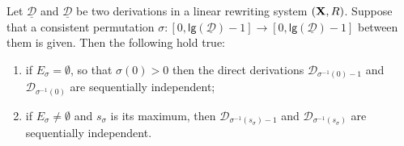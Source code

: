 \documentclass[a4paper,UKenglish,cleveref,pdftex,thm-restate,numberwithinsect,anonymous]{lipics}
\def\R{\mathsf{R}}
\def\X{\textbf {\textup{X}}}
\newcommand{\dder}[1]{\mathscr{#1}}
\newcommand{\der}[1]{\underline{\dder{#1}}}
\newcommand{\lgh}[0]{\mathsf{lg}}
\begin{document}
\begin{lemma}
	Let $\der{D}$ and $\der{D}$ be two derivations in a linear rewriting system $(\X, \R)$. Suppose that a consistent permutation $\sigma:[0, \lgh(\der{D})-1]\to [0, \lgh(\der{D})-1]$ between them is given. Then the following hold true:
	\begin{enumerate}
		\item if $E_{\sigma} = \emptyset$, so that $\sigma(0)>0$ then the direct derivations $\dder{D}_{\sigma^{-1}(0)-1}$ and $\dder{D}_{\sigma^{-1}(0)}$ are sequentially independent;
		\item if $E_{\sigma}\neq \emptyset$ and $s_\sigma$ is its maximum, then $\dder{D}_{\sigma^{-1}(s_\sigma)-1}$ and $\dder{D}_{\sigma^{-1}(s_\sigma)}$ are sequentially independent.
	\end{enumerate}
\end{lemma}
\end{document}
